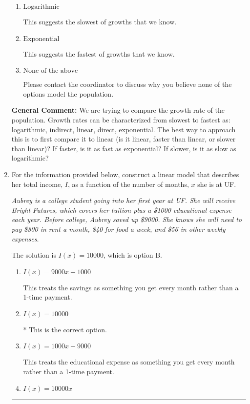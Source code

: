 \documentclass{extbook}[14pt]
\newcommand{\litem}[1]{\item #1

\rule{\textwidth}{0.4pt}}
\begin{document}
\begin{enumerate}
{\begin{enumerate}[label=\Alph*.]
This suggests a constant growth. You would be able to add or subtract the same amount year-to-year if this is the correct answer.
\item \( \text{Logarithmic} \)

This suggests the slowest of growths that we know.
\item \( \text{Exponential} \)

This suggests the fastest of growths that we know.
\item \( \text{None of the above} \)

Please contact the coordinator to discuss why you believe none of the options model the population.
\end{enumerate}

\textbf{General Comment:} We are trying to compare the growth rate of the population. Growth rates can be characterized from slowest to fastest as: logarithmic, indirect, linear, direct, exponential. The best way to approach this is to first compare it to linear (is it linear, faster than linear, or slower than linear)? If faster, is it as fast as exponential? If slower, is it as slow as logarithmic?
}
\litem{
For the information provided below, construct a linear model that describes her total income, $I$, as a function of the number of months, $x$ she is at UF.

\begin{center}
    \textit{ Aubrey is a college student going into her first year at UF. She will receive Bright Futures, which covers her tuition plus a \$1000 educational expense each year. Before college, Aubrey saved up \$9000. She knows she will need to pay \$800 in rent a month, \$40 for food a week, and \$56 in other weekly expenses. }
\end{center}
The solution is \( I(x) = 10000 \), which is option B.\begin{enumerate}[label=\Alph*.]
\item \( I(x) = 9000 x + 1000 \)

This treats the savings as something you get every month rather than a 1-time payment.
\item \( I(x) = 10000 \)

* This is the correct option.
\item \( I(x) = 1000 x + 9000 \)

This treats the educational expense as something you get every month rather than a 1-time payment.
\item \( I(x) = 10000 x \)


\end{enumerate}}
\end{enumerate}
\end{document}
